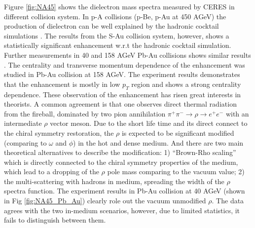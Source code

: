 Figure \ref{fig:NA45} shows the dielectron mass spectra measured
by CERES in different collision system. In p-A collisions (p-Be, p-Au
at 450 AGeV) the production of dielectron can be well explained by
the hadronic cocktail simulations \cite{PhysRevLett.75.1272}. The
results from the S-Au collision system, however, shows a statistically
significant enhancement w.r.t the hadronic cocktail simulation. Further
measurements in 40 and 158 AGeV Pb-Au collisions shows similar results
\cite{Agakichiev1998405,PhysRevLett.91.042301}. The centrality and
transverse momentum dependence of the enhancement was studied in Pb-Au
collision at 158 AGeV. The experiment results demonstrates that the
enhancement is mostly in low $p_{T}$ region and shows a strong centrality
dependence. These observation of the enhancement has risen great interests
in theorists. A common agreement is that one observes direct thermal
radiation from the fireball, dominated by two pion annihilation $\pi^{+}\pi^{-}\rightarrow\rho\rightarrow e^{+}e^{-}$
with an intermediate $\rho$ vector meson. Due to the short life time
and its direct connect to the chiral symmetry restoration, the $\rho$
is expected to be significant modified (comparing to $\omega$ and
$\phi$) in the hot and dense medium. And there are two main theoretical
alternatives to describe the modification: 1) ``Brown-Rho scaling''
which is directly connected to the chiral symmetry properties of the
medium, which lead to a dropping of the $\rho$ pole mass comparing
to the vacuum value; 2) the multi-scattering with hadrons in medium,
spreading the width of the $\rho$ spectra function. The experiment
results in Pb-Au collision at 40 AGeV (shown in Fig \ref{fig:NA45_Pb_Au})
clearly role out the vacuum unmodified $\rho$. The data agrees with
the two in-medium scenarios, however, due to limited statistics, it
fails to distinguish between them.

